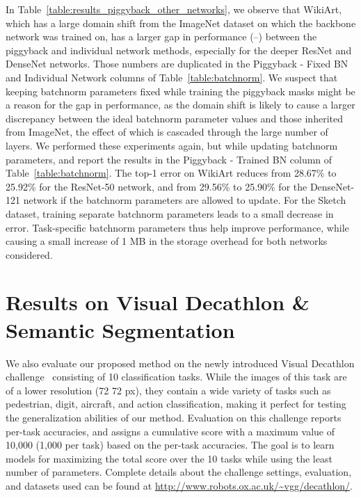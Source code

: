 \documentclass{llncs}
\begin{document}
In Table~\ref{table:results_piggyback_other_networks}, we observe that WikiArt, which has a large domain shift from the ImageNet dataset on which the backbone network was trained on, has a larger gap in performance (--) between the piggyback and individual network methods, especially for the deeper ResNet and DenseNet networks. 
Those numbers are duplicated in the Piggyback - Fixed BN and Individual Network columns of Table~\ref{table:batchnorm}. We suspect that keeping batchnorm parameters fixed while training the piggyback masks might be a reason for the gap in performance, as the domain shift is likely to cause a larger discrepancy between the ideal batchnorm parameter values and those inherited from ImageNet, the effect of which is cascaded through the large number of layers. We performed these experiments again, but while updating batchnorm parameters, and report the results in the Piggyback - Trained BN column of Table~\ref{table:batchnorm}.
The top-1 error on WikiArt reduces from 28.67\% to 25.92\% for the ResNet-50 network, and from 29.56\% to 25.90\% for the DenseNet-121 network if the batchnorm parameters are allowed to update. For the Sketch dataset, training separate batchnorm parameters leads to a small decrease in error. Task-specific batchnorm parameters thus help improve performance, while causing a small increase of 1 MB in the storage overhead for both networks considered. 



 \section{Results on Visual Decathlon \& Semantic Segmentation}
\label{sec:other_results}
\label{subsec:visual_decathlon}

We also evaluate our proposed method on the newly introduced Visual Decathlon challenge~\cite{rebuffi2017learning} consisting of 10 classification tasks. 
While the images of this task are of a lower resolution (72  72 px), they contain a wide variety of tasks such as pedestrian, digit, aircraft, and action classification, making it perfect for testing the generalization abilities of our method.
Evaluation on this challenge reports per-task accuracies, and assigns a cumulative score with a maximum value of 10,000 (1,000 per task) based on the per-task accuracies. The goal is to learn models for maximizing the total score over the 10 tasks while using the least number of parameters. 
Complete details about the challenge settings, evaluation, and datasets used can be found at {\small \url{http://www.robots.ox.ac.uk/~vgg/decathlon/}}.
\end{document}
